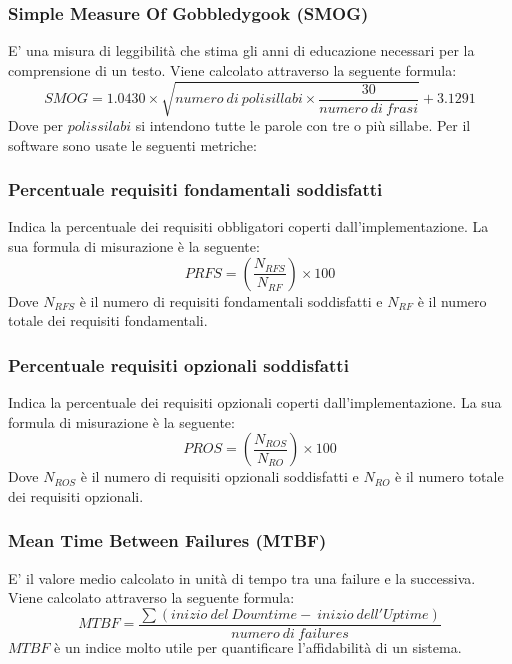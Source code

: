 		\subsubsection{Simple Measure Of Gobbledygook (SMOG)} E' una misura di leggibilità che stima gli anni di educazione necessari per la comprensione di un testo. Viene calcolato attraverso la seguente formula: \newline
		\[
		SMOG=1.0430\times\sqrt{numero ~di ~polisillabi\times\frac{30}{numero ~di ~frasi}}+3.1291
		\]\newline
		Dove per $polissilabi$ si intendono tutte le parole con tre o più sillabe.
		\newline \newline \newline
		Per il software sono usate le seguenti metriche:\newline
		\subsubsection{Percentuale requisiti fondamentali soddisfatti} Indica la percentuale dei requisiti obbligatori coperti dall’implementazione. La sua
		formula di misurazione è la seguente:\newline
		\[
		PRFS=(\frac{N_{RFS}}{N_{RF}}) \times 100
		\]	
		Dove $N_{RFS}$ è il numero di requisiti fondamentali soddisfatti e $N_{RF}$ è il numero totale
		dei requisiti fondamentali.
		\subsubsection{Percentuale requisiti opzionali soddisfatti} Indica la percentuale dei requisiti opzionali coperti dall’implementazione. La sua formula di misurazione è la seguente:\newline
		\[
		PROS=(\frac{N_{ROS}}{N_{RO}}) \times 100
		\]	
		Dove $N_{ROS}$ è il numero di requisiti opzionali soddisfatti e $N_{RO}$ è il numero totale
		dei requisiti opzionali.
		\subsubsection{Mean Time Between Failures (MTBF)} E' il valore medio calcolato in unità di tempo tra una failure e la successiva. Viene calcolato attraverso la seguente formula:\newline
		\[
		MTBF=\frac{\sum(inizio ~del ~Downtime - ~inizio ~dell'Uptime)}{numero ~di ~failures}
		\]\newline
		$MTBF$ è un indice molto utile per quantificare l'affidabilità di un sistema.

